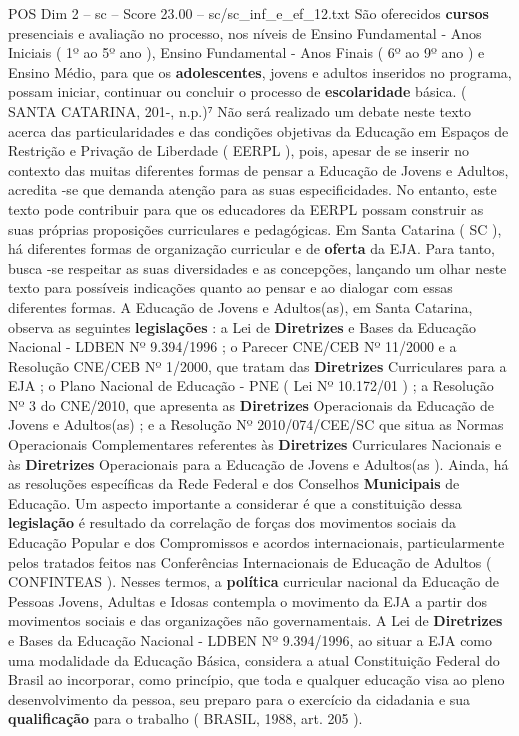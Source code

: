 \begin{textsample}{POS Dim 2 – sc – Score 23.00 – sc/sc\_inf\_e\_ef\_12.txt}
São oferecidos \textbf{cursos} presenciais e avaliação no processo, nos níveis de Ensino Fundamental - Anos Iniciais ( 1º ao 5º ano ), Ensino Fundamental - Anos Finais ( 6º ao 9º ano ) e Ensino Médio, para que os \textbf{adolescentes}, jovens e adultos inseridos no programa, possam iniciar, continuar ou concluir o processo de \textbf{escolaridade} básica. ( SANTA CATARINA, 201-, n.p.)⁷ Não será realizado um debate neste texto acerca das particularidades e das condições objetivas da Educação em Espaços de Restrição e Privação de Liberdade ( EERPL ), pois, apesar de se inserir no contexto das muitas diferentes formas de pensar a Educação de Jovens e Adultos, acredita -se que demanda atenção para as suas especificidades.
No entanto, este texto pode contribuir para que os educadores da EERPL possam construir as suas próprias proposições curriculares e pedagógicas.
Em Santa Catarina ( SC ), há diferentes formas de organização curricular e de \textbf{oferta} da EJA.
Para tanto, busca -se respeitar as suas diversidades e as concepções, lançando um olhar neste texto para possíveis indicações quanto ao pensar e ao dialogar com essas diferentes formas.
A Educação de Jovens e Adultos(as), em Santa Catarina, observa as seguintes \textbf{legislações} : a Lei de \textbf{Diretrizes} e Bases da Educação Nacional - LDBEN Nº 9.394/1996 ; o Parecer CNE/CEB Nº 11/2000 e a Resolução CNE/CEB Nº 1/2000, que tratam das \textbf{Diretrizes} Curriculares para a EJA ; o Plano Nacional de Educação - PNE ( Lei Nº 10.172/01 ) ; a Resolução Nº 3 do CNE/2010, que apresenta as \textbf{Diretrizes} Operacionais da Educação de Jovens e Adultos(as) ; e a Resolução Nº 2010/074/CEE/SC que situa as Normas Operacionais Complementares referentes às \textbf{Diretrizes} Curriculares Nacionais e às \textbf{Diretrizes} Operacionais para a Educação de Jovens e Adultos(as ).
Ainda, há as resoluções específicas da Rede Federal e dos Conselhos \textbf{Municipais} de Educação.
Um aspecto importante a considerar é que a constituição dessa \textbf{legislação} é resultado da correlação de forças dos movimentos sociais da Educação Popular e dos Compromissos e acordos internacionais, particularmente pelos tratados feitos nas Conferências Internacionais de Educação de Adultos ( CONFINTEAS ).
Nesses termos, a \textbf{política} curricular nacional da Educação de Pessoas Jovens, Adultas e Idosas contempla o movimento da EJA a partir dos movimentos sociais e das organizações não governamentais.
A Lei de \textbf{Diretrizes} e Bases da Educação Nacional - LDBEN Nº 9.394/1996, ao situar a EJA como uma modalidade da Educação Básica, considera a atual Constituição Federal do Brasil ao incorporar, como princípio, que toda e qualquer educação visa ao pleno desenvolvimento da pessoa, seu preparo para o exercício da cidadania e sua \textbf{qualificação} para o trabalho ( BRASIL, 1988, art. 205 ).

\end{textsample}
